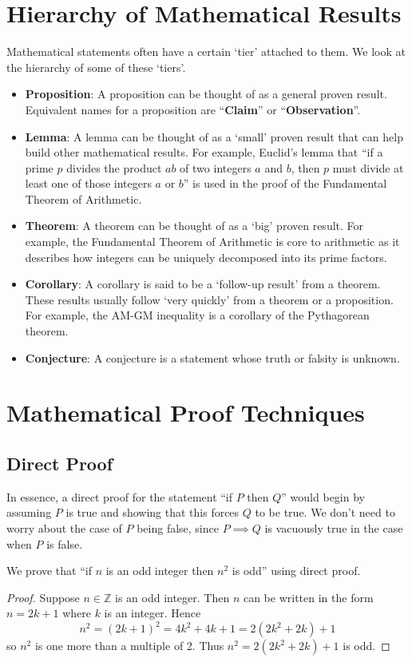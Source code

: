 \section{Hierarchy of Mathematical Results}
Mathematical statements often have a certain `tier' attached to them. We look at the hierarchy of some of these `tiers'.
\begin{itemize}
    \item \textbf{Proposition}: A proposition can be thought of as a general proven result. Equivalent names for a proposition are ``\textbf{Claim}'' or ``\textbf{Observation}''.
    \item \textbf{Lemma}: A lemma can be thought of as a `small' proven result that can help build other mathematical results. For example, Euclid's lemma that ``if a prime $p$ divides the product $ab$ of two integers $a$ and $b$, then $p$ must divide at least one of those integers $a$ or $b$'' is used in the proof of the Fundamental Theorem of Arithmetic.
    \item \textbf{Theorem}: A theorem can be thought of as a `big' proven result. For example, the Fundamental Theorem of Arithmetic is core to arithmetic as it describes how integers can be uniquely decomposed into its prime factors.
    \item \textbf{Corollary}: A corollary is said to be a `follow-up result' from a theorem. These results usually follow `very quickly' from a theorem or a proposition. For example, the AM-GM inequality is a corollary of the Pythagorean theorem.
    \item \textbf{Conjecture}: A conjecture is a statement whose truth or falsity is unknown.
\end{itemize}

\section{Mathematical Proof Techniques}
\subsection{Direct Proof}
In essence, a direct proof for the statement ``if $P$ then $Q$'' would begin by assuming $P$ is true and showing that this forces $Q$ to be true. We don't need to worry about the case of $P$ being false, since $P \implies Q$ is vacuously true in the case when $P$ is false.
\begin{example}
    We prove that ``if $n$ is an odd integer then $n^2$ is odd'' using direct proof.
    \begin{proof}
        Suppose $n\in\mathbb{Z}$ is an odd integer. Then $n$ can be written in the form $n = 2k + 1$ where $k$ is an integer. Hence
        \[
            n^2 = (2k+1)^2 = 4k^2 + 4k + 1 = 2(2k^2 + 2k) + 1
        \]
        so $n^2$ is one more than a multiple of 2. Thus $n^2 = 2(2k^2 + 2k) + 1$ is odd.
    \end{proof}
\end{example}

